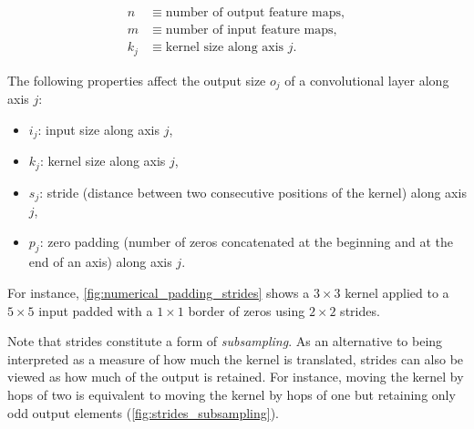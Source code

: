 \documentclass[notitlepage]{report}
\begin{document}
\begin{equation*}
\begin{split}
    n &\equiv \text{number of output feature maps},\\
    m &\equiv \text{number of input feature maps},\\
    k_j &\equiv \text{kernel size along axis $j$}.
\end{split}
\end{equation*}

The following properties affect the output size $o_j$ of a convolutional layer
along axis $j$:

\begin{itemize}
    \item $i_j$: input size along axis $j$,
    \item $k_j$: kernel size along axis $j$,
    \item $s_j$: stride (distance between two consecutive positions of the
        kernel) along axis $j$,
    \item $p_j$: zero padding (number of zeros concatenated at the beginning and
        at the end of an axis) along axis $j$.
\end{itemize}

\noindent For instance, \autoref{fig:numerical_padding_strides} shows a $3
\times 3$ kernel applied to a $5 \times 5$ input padded with a $1 \times 1$
border of zeros using $2 \times 2$ strides.

Note that strides constitute a form of \emph{subsampling}. As an alternative to
being interpreted as a measure of how much the kernel is translated, strides
can also be viewed as how much of the output is retained. For instance, moving
the kernel by hops of two is equivalent to moving the kernel by hops of one but
retaining only odd output elements (\autoref{fig:strides_subsampling}).
\end{document}
